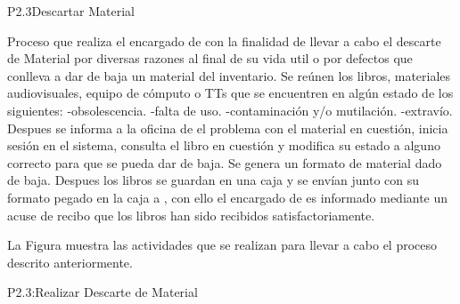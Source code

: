 
\begin{Proceso}{P2.3}{Descartar Material} {
  

  Proceso que realiza el encargado de  con la finalidad de llevar a cabo el descarte de Material por diversas razones al final de su vida util o por defectos que conlleva a dar de baja un material del inventario.
\vspace{5mm}	
  Se reúnen los libros, materiales audiovisuales, equipo de cómputo o TTs que se encuentren en algún estado de los siguientes:
  -obsolescencia.
  -falta de uso.
  -contaminación y/o mutilación.
  -extravío.
Despues se informa a la oficina de  el problema con el material en cuestión, inicia sesión en el sistema, consulta el libro en cuestión y modifica su estado a alguno correcto para que se pueda dar de baja.
Se genera un formato de material dado de baja.
Despues los libros se guardan en una caja y se envían junto con su formato pegado en la caja a , con ello el encargado de  es informado mediante un acuse de recibo que los libros han sido recibidos satisfactoriamente.




  \noindent La Figura  muestra las actividades que se realizan para llevar a cabo el proceso descrito anteriormente.


} {P2.3:Realizar Descarte de Material}



\end{Proceso}

